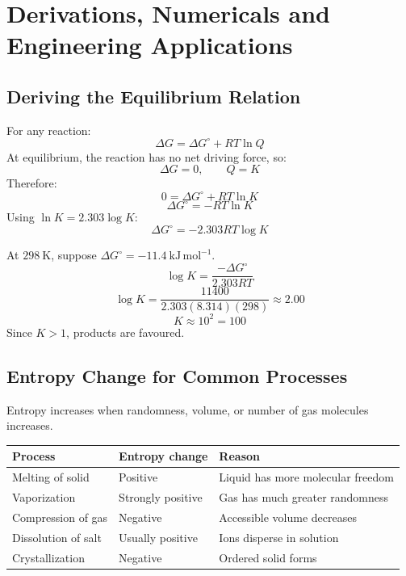 \documentclass[12pt,a4paper]{article}
\begin{document}
\section{Derivations, Numericals and Engineering Applications}

\subsection{Deriving the Equilibrium Relation}
For any reaction:
\[
\Delta G=\Delta G^\circ+RT\ln Q
\]
At equilibrium, the reaction has no net driving force, so:
\[
\Delta G=0,\qquad Q=K
\]
Therefore:
\[
0=\Delta G^\circ+RT\ln K
\]
\[
\Delta G^\circ=-RT\ln K
\]
Using $\ln K=2.303\log K$:
\[
\Delta G^\circ=-2.303RT\log K
\]

\begin{tcolorbox}[examplebox, title={Solved Example: Equilibrium Constant from Free Energy}]
At $298\ \mathrm{K}$, suppose $\Delta G^\circ=-11.4\ \mathrm{kJ\,mol^{-1}}$.
\[
\log K=\frac{-\Delta G^\circ}{2.303RT}
\]
\[
\log K=\frac{11400}{2.303(8.314)(298)}\approx2.00
\]
\[
K\approx10^2=100
\]
Since $K>1$, products are favoured.
\end{tcolorbox}

\subsection{Entropy Change for Common Processes}
Entropy increases when randomness, volume, or number of gas molecules increases.

\begin{tabularx}{\linewidth}{|B{3.5cm}|Y|Y|}
\hline
\textbf{Process} & \textbf{Entropy change} & \textbf{Reason} \\
\hline
Melting of solid & Positive & Liquid has more molecular freedom \\
\hline
Vaporization & Strongly positive & Gas has much greater randomness \\
\hline
Compression of gas & Negative & Accessible volume decreases \\
\hline
Dissolution of salt & Usually positive & Ions disperse in solution \\
\hline
Crystallization & Negative & Ordered solid forms \\
\hline
\end{tabularx}
\end{document}
